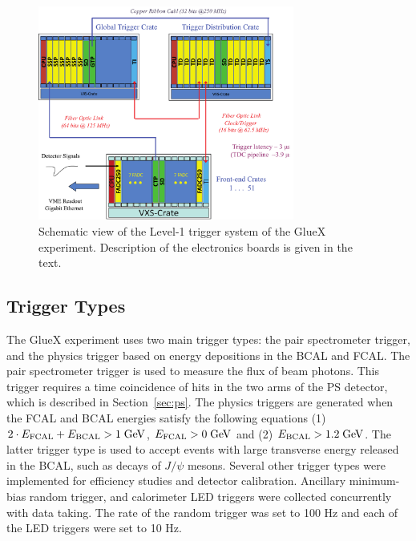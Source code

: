 \begin{figure}[tbp]
\begin{center}
\includegraphics[width=0.75\textwidth]{figures/125_Somov-f1.pdf}  
\caption{Schematic view of the Level-1 trigger system of the GlueX experiment. Description of the electronics boards is given in the text.} \label{fig:trig}
\end{center}
\end{figure}

\subsection{Trigger Types \label{sec:triggers}}

The GlueX experiment uses two main trigger types: the pair spectrometer trigger, and the physics trigger based on energy depositions in the BCAL and FCAL. The 
pair spectrometer trigger is used to measure the flux of beam photons. This trigger requires a time coincidence of hits in the 
two arms of the PS detector, which is described in Section~\ref{sec:ps}. The physics triggers are generated when the FCAL and BCAL energies  satisfy the following equations (1) $2\cdot E_{\rm FCAL} + E_{\rm BCAL} > 1\;{\rm GeV}$,  $E_{\rm FCAL} > 0\; {\rm GeV}$ and (2) $E_{\rm BCAL} > 1.2\;{\rm GeV}$. The latter trigger type is used to accept events with large transverse energy released in the BCAL, such as decays of $J/\psi$ mesons.
Several other trigger types were implemented for efficiency studies and detector calibration. Ancillary minimum-bias random trigger, 
and calorimeter LED triggers were collected concurrently with data taking. The rate of the random trigger was set to 100 Hz and each of the LED triggers were set to 10 Hz.

